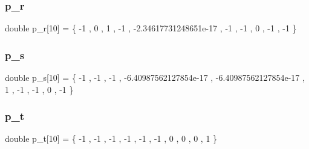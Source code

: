 \subsubsection{\texorpdfstring{p\+\_\+r}{p\_r}}
{\footnotesize\ttfamily double p\+\_\+r\mbox{[}10\mbox{]} = \{ -\/1 , 0 , 1 , -\/1 , -\/2.\+34617731248651e-\/17 , -\/1 , -\/1 , 0 , -\/1 , -\/1 \}}

\mbox{\label{a00482_ab412f40aac46b2e78aceb916a6f1b16f}} 
\subsubsection{\texorpdfstring{p\+\_\+s}{p\_s}}
{\footnotesize\ttfamily double p\+\_\+s\mbox{[}10\mbox{]} = \{ -\/1 , -\/1 , -\/1 , -\/6.\+40987562127854e-\/17 , -\/6.\+40987562127854e-\/17 , 1 , -\/1 , -\/1 , 0 , -\/1 \}}

\mbox{\label{a00482_a7b071b440a3000e20968bd1d42cf6984}} 
\subsubsection{\texorpdfstring{p\+\_\+t}{p\_t}}
{\footnotesize\ttfamily double p\+\_\+t\mbox{[}10\mbox{]} = \{ -\/1 , -\/1 , -\/1 , -\/1 , -\/1 , -\/1 , 0 , 0 , 0 , 1 \}}

